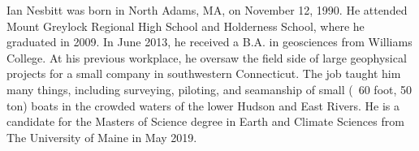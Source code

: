 \begin{biography}			%
Ian Nesbitt was born in North Adams, MA, on November 12, 1990. He attended Mount Greylock Regional High School and Holderness School, where he graduated in 2009. In June 2013, he received a B.A. in geosciences from Williams College. At his previous workplace, he oversaw the field side of large geophysical projects for a small company in southwestern Connecticut. The job taught him many things, including  surveying, piloting, and seamanship of small (~60 foot, 50 ton) boats in the crowded waters of the lower Hudson and East Rivers. He is a candidate for the Masters of Science degree in Earth and Climate Sciences from The University of Maine in May 2019. 
\end{biography}

\endinput